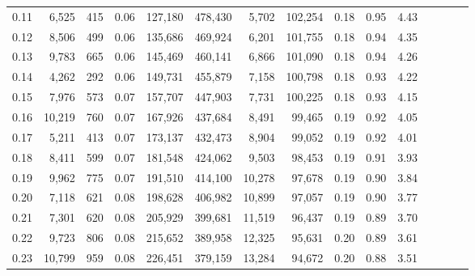 \begin{tabular}{rrrcrrrrrrrrrrr}
0.11 &   6,525 &     415 &                                       0.06 &  127,180 &  478,430 &    5,702 &  102,254 &  0.18 &  0.95 &                         4.43 \\
0.12 &   8,506 &     499 &                                       0.06 &  135,686 &  469,924 &    6,201 &  101,755 &  0.18 &  0.94 &                         4.35 \\
0.13 &   9,783 &     665 &                                       0.06 &  145,469 &  460,141 &    6,866 &  101,090 &  0.18 &  0.94 &                         4.26 \\
0.14 &   4,262 &     292 &                                       0.06 &  149,731 &  455,879 &    7,158 &  100,798 &  0.18 &  0.93 &                         4.22 \\
0.15 &   7,976 &     573 &                                       0.07 &  157,707 &  447,903 &    7,731 &  100,225 &  0.18 &  0.93 &                         4.15 \\
0.16 &  10,219 &     760 &                                       0.07 &  167,926 &  437,684 &    8,491 &   99,465 &  0.19 &  0.92 &                         4.05 \\
0.17 &   5,211 &     413 &                                       0.07 &  173,137 &  432,473 &    8,904 &   99,052 &  0.19 &  0.92 &                         4.01 \\
0.18 &   8,411 &     599 &                                       0.07 &  181,548 &  424,062 &    9,503 &   98,453 &  0.19 &  0.91 &                         3.93 \\
0.19 &   9,962 &     775 &                                       0.07 &  191,510 &  414,100 &   10,278 &   97,678 &  0.19 &  0.90 &                         3.84 \\
0.20 &   7,118 &     621 &                                       0.08 &  198,628 &  406,982 &   10,899 &   97,057 &  0.19 &  0.90 &                         3.77 \\
0.21 &   7,301 &     620 &                                       0.08 &  205,929 &  399,681 &   11,519 &   96,437 &  0.19 &  0.89 &                         3.70 \\
0.22 &   9,723 &     806 &                                       0.08 &  215,652 &  389,958 &   12,325 &   95,631 &  0.20 &  0.89 &                         3.61 \\
0.23 &  10,799 &     959 &                                       0.08 &  226,451 &  379,159 &   13,284 &   94,672 &  0.20 &  0.88 &                         3.51 \\

\end{tabular}
